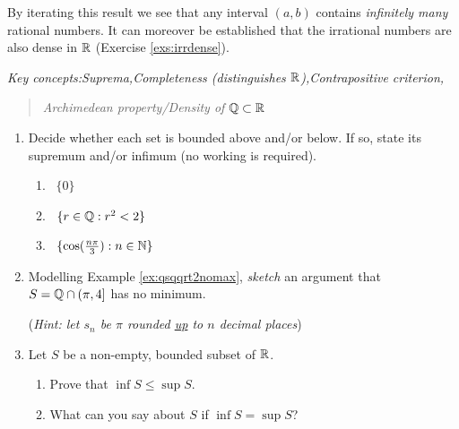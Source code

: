
By iterating this result we see that any interval $(a,b)$ contains \emph{infinitely many} rational numbers. It can moreover be established that the irrational numbers are also dense in $\mathbb{R}$ (Exercise \ref{exs:irrdense}).




\begin{exercises}{}{}
	\emph{Key concepts:\quad Suprema,\quad Completeness (distinguishes $\mathbb{R}$),\quad Contrapositive criterion,}
	\begin{quote}
		\emph{Archimedean property/Density of $\mathbb{Q}\subset\mathbb{R}$}
	\end{quote}
	
	\begin{enumerate}
	  \item Decide whether each set is bounded above and/or below. If so, state its supremum and/or infimum (no working is required).
	  \begin{enumerate}
	    \item {}  \ $\{0\}$
	    \setcounter{enumii}{3}
	    \item {}  \ $\{r\in\mathbb{Q}:r^2<2\}$
	    \setcounter{enumii}{6}
	    \item {}  \ $\{\cos(\frac{n\pi}3):n\in\mathbb{N}\}$
  \end{enumerate}

  
  	\item Modelling Example \ref{ex:qsqqrt2nomax}, \emph{sketch} an argument that $S=\mathbb{Q}\cap (\pi,4]$ has no minimum.\par
  	(\emph{Hint: let $s_n$ be $\pi$ rounded \underline{up} to $n$ decimal places})
  
  
  	\goodbreak
  
  
		\item %
		Let $S$ be a non-empty, bounded subset of $\mathbb{R}$.
  	\begin{enumerate}
		  \item Prove that $\inf S\le \sup S$. %
		  \item What can you say about $S$ if $\inf S=\sup S$?
  	\end{enumerate}
  

\end{enumerate}
\end{exercises}

